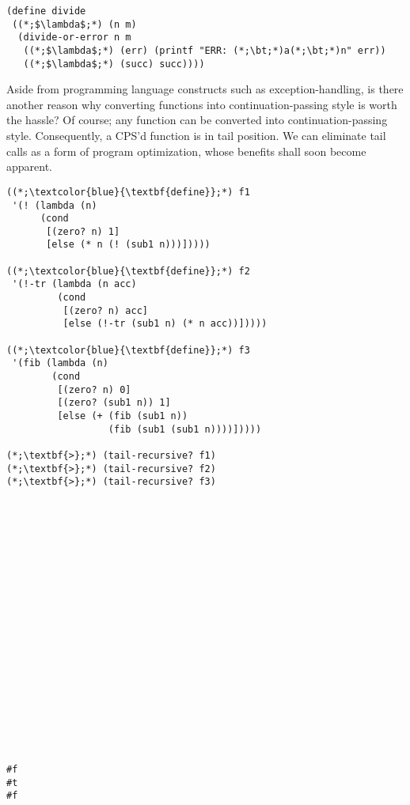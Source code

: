 \begin{cl}[]{}\begin{lstlisting}[language=MyScheme]
(define divide
 ((*;$\lambda$;*) (n m)
  (divide-or-error n m
   ((*;$\lambda$;*) (err) (printf "ERR: (*;\bt;*)a(*;\bt;*)n" err))
   ((*;$\lambda$;*) (succ) succ))))
\end{lstlisting}\end{cl}

Aside from programming language constructs such as exception-handling, is there another reason why converting functions into continuation-passing style is worth the hassle? Of course; any function can be converted into continuation-passing style. Consequently, a CPS'd function is in tail position. We can eliminate tail calls as a form of program optimization, whose benefits shall soon become apparent.


\begin{clonarrow}[]{}
\begin{lstlisting}[language=MySOutput]
((*;\textcolor{blue}{\textbf{define}};*) f1 
 '(! (lambda (n)
      (cond
       [(zero? n) 1]
       [else (* n (! (sub1 n)))]))))

((*;\textcolor{blue}{\textbf{define}};*) f2
 '(!-tr (lambda (n acc)
         (cond
          [(zero? n) acc]
          [else (!-tr (sub1 n) (* n acc))]))))

((*;\textcolor{blue}{\textbf{define}};*) f3
 '(fib (lambda (n)
        (cond
         [(zero? n) 0]
         [(zero? (sub1 n)) 1]
         [else (+ (fib (sub1 n)) 
                  (fib (sub1 (sub1 n))))]))))

(*;\textbf{>};*) (tail-recursive? f1)
(*;\textbf{>};*) (tail-recursive? f2)
(*;\textbf{>};*) (tail-recursive? f3)
\end{lstlisting}
\tcblower
\begin{lstlisting}[language=MyOutput]




















#f
#t
#f
\end{lstlisting}
\end{clonarrow}

